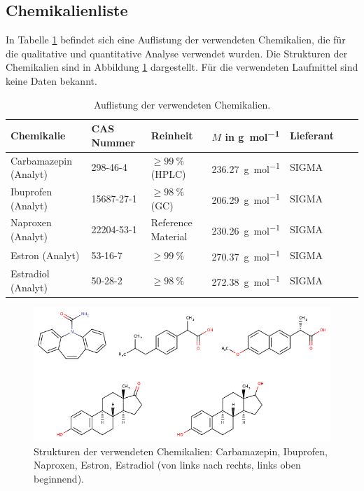   \subsection{Chemikalienliste} \label{sec:Chemikalien}
  
    In Tabelle \ref{tab:Chemikalien} befindet sich eine Auflistung der verwendeten Chemikalien, die für die qualitative und quantitative Analyse verwendet wurden. Die Strukturen der Chemikalien sind in Abbildung \ref{fig:Strukturen} dargestellt. Für die verwendeten Laufmittel sind keine Daten bekannt. 
    
      \begin{table}[H]
        \centering
        \caption[Auflistung der verwendeten Chemikalien, Quelle: Autor]{Auflistung der verwendeten Chemikalien.}
      
        \label{tab:Chemikalien}
        \begin{tabular}{@{}l|llllp{4.5cm}l@{}}
          \toprule
          Chemikalie & CAS Nummer & Reinheit & $M$ in \si{\gram\per\mole} & Lieferant \\ \midrule
           Carbamazepin (Analyt)  & 298-46-4 & $\geq \SI[mode=text]{99}{\percent}$ (HPLC) & \SI[mode=text]{236.27}{\gram\per\mole} & SIGMA \\
           Ibuprofen (Analyt)  & 15687-27-1 & $\geq \SI[mode=text]{98}{\percent}$ (GC) & \SI[mode=text]{206.29}{\gram\per\mole} & SIGMA \\
           Naproxen (Analyt) & 22204-53-1 & Reference Material & \SI[mode=text]{230.26}{\gram\per\mole} & SIGMA \\
           Estron (Analyt) & 53-16-7 & $\geq \SI[mode=text]{99}{\percent}$ & \SI[mode=text]{270.37}{\gram\per\mole} & SIGMA \\
           Estradiol (Analyt) & 50-28-2 & $\geq \SI[mode=text]{98}{\percent}$ & \SI[mode=text]{272.38}{\gram\per\mole} & SIGMA \\ \bottomrule
        \end{tabular}
      \end{table}
    
      \begin{figure}[H]
        \includegraphics[scale=0.45, center]{images/Structures.png} 
        \caption[Strukturen der verwendeten Chemikalien, Quelle: Autor]{Strukturen der verwendeten Chemikalien: Carbamazepin, Ibuprofen, Naproxen, Estron, Estradiol (von links nach rechts, links oben beginnend).}
        \label{fig:Strukturen}
      \end{figure}
    

